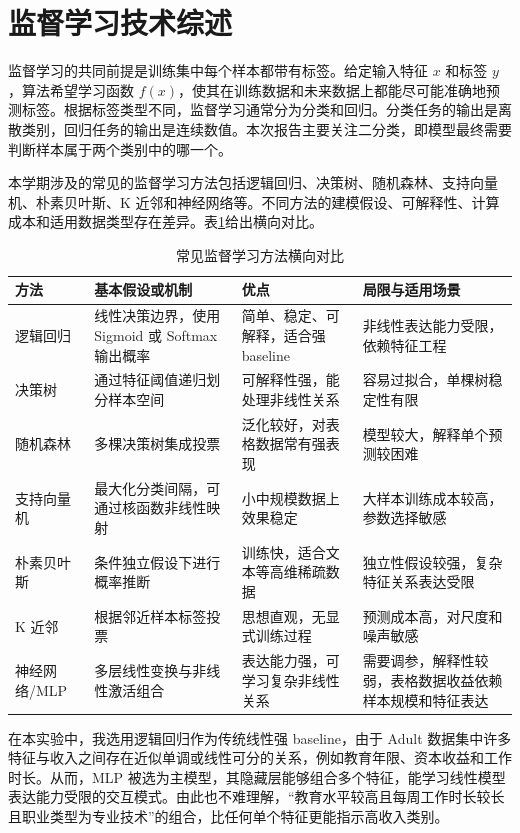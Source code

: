 \documentclass[UTF8,a4paper,12pt]{ctexart}
\begin{document}
\section{监督学习技术综述}
监督学习的共同前提是训练集中每个样本都带有标签。给定输入特征 $x$ 和标签 $y$，算法希望学习函数 $f(x)$，使其在训练数据和未来数据上都能尽可能准确地预测标签。根据标签类型不同，监督学习通常分为分类和回归。分类任务的输出是离散类别，回归任务的输出是连续数值。本次报告主要关注二分类，即模型最终需要判断样本属于两个类别中的哪一个。

本学期涉及的常见的监督学习方法包括逻辑回归、决策树、随机森林、支持向量机、朴素贝叶斯、K 近邻和神经网络等。不同方法的建模假设、可解释性、计算成本和适用数据类型存在差异。表\ref{tab:methods}给出横向对比。
\begin{table}[H]
\centering
\caption{常见监督学习方法横向对比}
\label{tab:methods}
\begin{tabular}{p{2cm}p{3.2cm}p{3.4cm}p{3.9cm}}
\toprule
方法 & 基本假设或机制 & 优点 & 局限与适用场景 \\
\midrule
逻辑回归 & 线性决策边界，使用 Sigmoid 或 Softmax 输出概率 & 简单、稳定、可解释，适合强 baseline & 非线性表达能力受限，依赖特征工程 \\
决策树 & 通过特征阈值递归划分样本空间 & 可解释性强，能处理非线性关系 & 容易过拟合，单棵树稳定性有限 \\
随机森林 & 多棵决策树集成投票 & 泛化较好，对表格数据常有强表现 & 模型较大，解释单个预测较困难 \\
支持向量机 & 最大化分类间隔，可通过核函数非线性映射 & 小中规模数据上效果稳定 & 大样本训练成本较高，参数选择敏感 \\
朴素贝叶斯 & 条件独立假设下进行概率推断 & 训练快，适合文本等高维稀疏数据 & 独立性假设较强，复杂特征关系表达受限 \\
K 近邻 & 根据邻近样本标签投票 & 思想直观，无显式训练过程 & 预测成本高，对尺度和噪声敏感 \\
神经网络/MLP & 多层线性变换与非线性激活组合 & 表达能力强，可学习复杂非线性关系 & 需要调参，解释性较弱，表格数据收益依赖样本规模和特征表达 \\
\bottomrule
\end{tabular}
\end{table}

在本实验中，我选用逻辑回归作为传统线性强 baseline，由于 Adult 数据集中许多特征与收入之间存在近似单调或线性可分的关系，例如教育年限、资本收益和工作时长。从而，MLP 被选为主模型，其隐藏层能够组合多个特征，能学习线性模型表达能力受限的交互模式。由此也不难理解，“教育水平较高且每周工作时长较长且职业类型为专业技术”的组合，比任何单个特征更能指示高收入类别。
\end{document}
